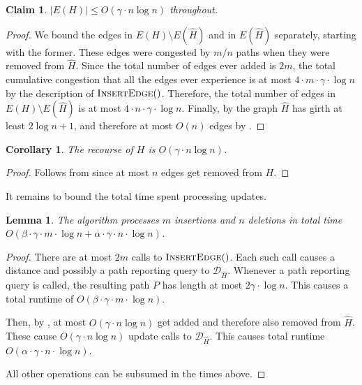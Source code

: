 \documentclass[11pt]{article}
\newtheorem{corollary}[theorem]{Corollary}
\newtheorem{lemma}[theorem]{Lemma}
\newtheorem{claim}[theorem]{Claim}
\renewcommand{\hat}{\widehat}
\begin{document}
\begin{claim}\label{clm:number_edges}
    $|E(H)| \leq O(\gamma \cdot n \log n)$ throughout. 
\end{claim}
\begin{proof}
    We bound the edges in $E(H) \setminus E(\widehat{H})$ and in $E(\widehat{H})$ separately, starting with the former. These edges were congested by $m/n$ paths when they were removed from $\hat{H}$. Since the total number of edges ever added is $2m$, the total cumulative congestion that all the edges ever experience is at most $4 \cdot m \cdot \gamma \cdot \log n$ by the description of $\textsc{InsertEdge}()$. Therefore, the total number of edges in $E(H) \setminus E(\widehat{H})$ is at most $4 \cdot n \cdot \gamma \cdot \log n$. Finally, by  the graph $\hat{H}$ has girth at least $2\log n + 1$, and therefore at most $O(n)$ edges by . 
\end{proof}
\begin{corollary} \label{cor:recourse}
    The recourse of $H$ is $O(\gamma \cdot n \log n)$.
\end{corollary}
\begin{proof}
    Follows from  since at most $n$ edges get removed from $H$. 
\end{proof}

It remains to bound the total time spent processing updates. 

\begin{lemma}\label{lma:runtime}
    The algorithm processes $m$ insertions and $n$ deletions in total time $O(\beta \cdot \gamma \cdot m 
\cdot \log n + \alpha \cdot \gamma \cdot n \cdot \log n)$. 
\end{lemma}
\begin{proof}
    There are at most $2m$ calls to $\textsc{InsertEdge}()$. Each such call causes a distance and possibly a path reporting query to $\mathcal{D}_{\hat{H}}$. Whenever a path reporting query is called, the resulting path $P$ has length at most $2\gamma \cdot \log n$. This causes a total runtime of $O(\beta \cdot \gamma \cdot m \cdot \log n)$.

    Then, by , at most $O(\gamma \cdot n \log n)$ get added and therefore also removed from $\hat{H}$. These cause $O(\gamma \cdot n \log n)$ update calls to $\mathcal{D}_{\hat{H}}$. This causes total runtime $O(\alpha \cdot \gamma \cdot n \cdot \log n)$. 

    All other operations can be subsumed in the times above. 
\end{proof}
\end{document}
